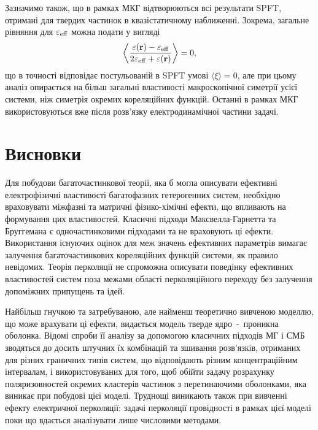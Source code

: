 \documentclass[14pt,twoside]{vakthesis}
\begin{document}
Зазначимо також, що в рамках МКГ відтворюються всі результати  SPFT, отримані для твердих частинок в квазістатичному наближенні. Зокрема, загальне рівняння для $\varepsilon_{\rm eff}$ можна подати у  вигляді \cite{Sushko2017}
\begin{equation}\label{eq:general-CGA-origin-short}
\left\langle \frac{\varepsilon({\bf r}) - \varepsilon_{\rm eff}}{2\varepsilon_{\rm eff} + \varepsilon({\bf r})} \right\rangle = 0,
\end{equation}
що в точності відповідає постульованій в SPFT умові $\langle \xi \rangle = 0$, але при цьому аналіз опирається на більш загальні властивості макроскопічної симетрії усієї системи, ніж симетрія окремих кореляційних функцій. Останні в рамках МКГ використовуються вже після розв'язку  електродинамічної частини задачі.


\section{Висновки}

Для побудови багаточастинкової теорії, яка б могла описувати ефективні електрофізичні властивості багатофазних гетерогенних систем, необхідно враховувати міжфазні та матричні фізико-хімічні ефекти, що впливають на формування цих властивостей. 
Класичні підходи Максвелла-Гарнетта та Бруггемана є  одночастинковими підходами та не враховують ці ефекти. Використання існуючих оцінок для меж значень ефективних параметрів вимагає залучення багаточастинкових  кореляційних функцій системи, як правило невідомих. Теорія перколяції не спроможна описувати поведінку ефективних властивостей систем поза межами області перколяційного переходу без залучення допоміжних припущень та ідей. 

Найбільш гнучкою та затребуваною, але найменш теоретично вивченою моделлю, що може врахувати ці ефекти, видається модель тверде ядро~-~проникна оболонка.
Відомі спроби її аналізу за допомогою класичних підходів МГ і СМБ
зводяться до досить штучних їх комбінацій та зшивання розв'язків, отриманих для різних граничних типів систем, що відповідають різним концентраційним інтервалам, і використовуваних для того, щоб  обійти задачу розрахунку поляризовностей окремих кластерів частинок з перетинаючими оболонками, яка виникає при побудові цієї моделі. 
Труднощі виникають також при вивченні ефекту електричної перколяції:  задачі перколяції провідності в рамках цієї моделі поки що вдається аналізувати лише числовими методами.
\end{document}
